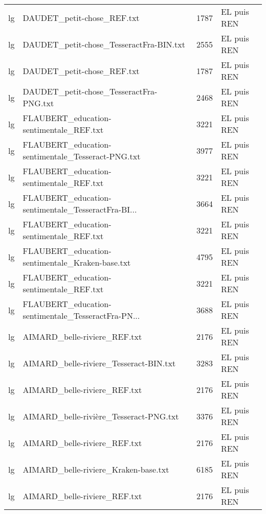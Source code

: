\begin{tabular}{llrl}
    lg &                         DAUDET\_petit-chose\_REF.txt &                  1787 & EL puis REN \\
    lg &            DAUDET\_petit-chose\_TesseractFra-BIN.txt &                  2555 & EL puis REN \\
    lg &                         DAUDET\_petit-chose\_REF.txt &                  1787 & EL puis REN \\
    lg &            DAUDET\_petit-chose\_TesseractFra-PNG.txt &                  2468 & EL puis REN \\
    lg &            FLAUBERT\_education-sentimentale\_REF.txt &                  3221 & EL puis REN \\
    lg &  FLAUBERT\_education-sentimentale\_Tesseract-PNG.txt &                  3977 & EL puis REN \\
    lg &            FLAUBERT\_education-sentimentale\_REF.txt &                  3221 & EL puis REN \\
    lg & FLAUBERT\_education-sentimentale\_TesseractFra-BI... &                  3664 & EL puis REN \\
    lg &            FLAUBERT\_education-sentimentale\_REF.txt &                  3221 & EL puis REN \\
    lg &    FLAUBERT\_education-sentimentale\_Kraken-base.txt &                  4795 & EL puis REN \\
    lg &            FLAUBERT\_education-sentimentale\_REF.txt &                  3221 & EL puis REN \\
    lg & FLAUBERT\_education-sentimentale\_TesseractFra-PN... &                  3688 & EL puis REN \\
    lg &                       AIMARD\_belle-riviere\_REF.txt &                  2176 & EL puis REN \\
    lg &             AIMARD\_belle-riviere\_Tesseract-BIN.txt &                  3283 & EL puis REN \\
    lg &                       AIMARD\_belle-riviere\_REF.txt &                  2176 & EL puis REN \\
    lg &             AIMARD\_belle-rivière\_Tesseract-PNG.txt &                  3376 & EL puis REN \\
    lg &                       AIMARD\_belle-riviere\_REF.txt &                  2176 & EL puis REN \\
    lg &               AIMARD\_belle-riviere\_Kraken-base.txt &                  6185 & EL puis REN \\
    lg &                       AIMARD\_belle-riviere\_REF.txt &                  2176 & EL puis REN \\

\end{tabular}
